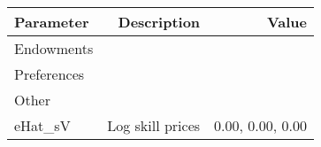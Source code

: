 \begin{tabular}{lrr}
\hline
Parameter & Description  & Value  \\
\hline
Endowments &   &   \\
Preferences &   &   \\
Other &   &   \\
eHat_sV & Log skill prices  & 0.00, 0.00, 0.00  \\
\hline
\end{tabular}%
